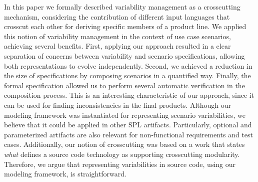 \documentclass[11pt]{report}
\begin{document}
In this paper we formally described variability management as a 
crosscutting mechanism, considering the contribution 
of different input languages that crosscut each other for deriving 
specific members of a product line. 
We applied this notion of variability management in the context of use 
case scenarios, achieving several benefits. First, applying our approach resulted in 
a clear separation of concerns between variability and scenario specifications, 
allowing both representations to evolve independently. Second, we achieved a reduction 
in the size of specifications by composing scenarios in a quantified way. Finally, the 
formal specification allowed us to perform several automatic verification in the composition 
process. This is an interesting characteristic of our approach, since it can be used 
for finding inconsistencies in the final products.
Although our modeling framework was instantiated for representing 
scenario variabilities, we believe that it could be applied in 
other SPL artifacts. Particularly, optional and parameterized artifacts 
are also relevant for non-functional requirements and test cases. 
Additionally, our notion of crosscutting was based on a work that states \emph{what} 
defines a source code technology as supporting crosscutting modularity. Therefore, 
we argue that representing variabilities in source code, using our modeling framework, 
is straightforward.   


%
%



\end{document}
